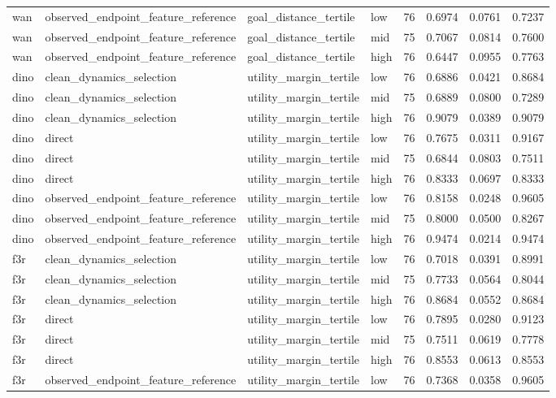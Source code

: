 \begin{tabular}{llllrrrr}
wan & observed\_endpoint\_feature\_reference & goal\_distance\_tertile & low & 76 & 0.6974 & 0.0761 & 0.7237 \\
wan & observed\_endpoint\_feature\_reference & goal\_distance\_tertile & mid & 75 & 0.7067 & 0.0814 & 0.7600 \\
wan & observed\_endpoint\_feature\_reference & goal\_distance\_tertile & high & 76 & 0.6447 & 0.0955 & 0.7763 \\
dino & clean\_dynamics\_selection & utility\_margin\_tertile & low & 76 & 0.6886 & 0.0421 & 0.8684 \\
dino & clean\_dynamics\_selection & utility\_margin\_tertile & mid & 75 & 0.6889 & 0.0800 & 0.7289 \\
dino & clean\_dynamics\_selection & utility\_margin\_tertile & high & 76 & 0.9079 & 0.0389 & 0.9079 \\
dino & direct & utility\_margin\_tertile & low & 76 & 0.7675 & 0.0311 & 0.9167 \\
dino & direct & utility\_margin\_tertile & mid & 75 & 0.6844 & 0.0803 & 0.7511 \\
dino & direct & utility\_margin\_tertile & high & 76 & 0.8333 & 0.0697 & 0.8333 \\
dino & observed\_endpoint\_feature\_reference & utility\_margin\_tertile & low & 76 & 0.8158 & 0.0248 & 0.9605 \\
dino & observed\_endpoint\_feature\_reference & utility\_margin\_tertile & mid & 75 & 0.8000 & 0.0500 & 0.8267 \\
dino & observed\_endpoint\_feature\_reference & utility\_margin\_tertile & high & 76 & 0.9474 & 0.0214 & 0.9474 \\
f3r & clean\_dynamics\_selection & utility\_margin\_tertile & low & 76 & 0.7018 & 0.0391 & 0.8991 \\
f3r & clean\_dynamics\_selection & utility\_margin\_tertile & mid & 75 & 0.7733 & 0.0564 & 0.8044 \\
f3r & clean\_dynamics\_selection & utility\_margin\_tertile & high & 76 & 0.8684 & 0.0552 & 0.8684 \\
f3r & direct & utility\_margin\_tertile & low & 76 & 0.7895 & 0.0280 & 0.9123 \\
f3r & direct & utility\_margin\_tertile & mid & 75 & 0.7511 & 0.0619 & 0.7778 \\
f3r & direct & utility\_margin\_tertile & high & 76 & 0.8553 & 0.0613 & 0.8553 \\
f3r & observed\_endpoint\_feature\_reference & utility\_margin\_tertile & low & 76 & 0.7368 & 0.0358 & 0.9605 \\

\end{tabular}
